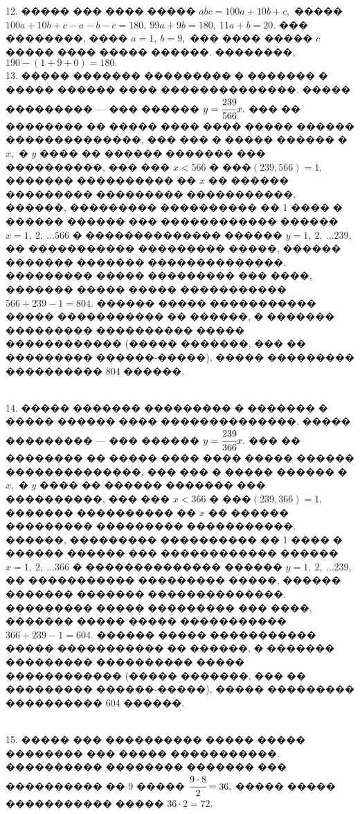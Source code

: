 \documentclass[12pt]{article}
\begin{document}
12. ����� ��� ���� ����� $\overline{abc}=100a+10b+c,$ ����� $100a+10b+c-a-b-c=180,\ 99a+9b=180,\ 11a+b=20.$ ��� ��������, ���� $a=1,\ b=9,$ ��� ���� ����� $c$ ����� ���� ����� ������. ��������, $190-(1+9+0)=180.$\\
13. ����� ������� ��������� � ������� � ����� ������ ���� ��������������. ����� ��������� --- ��� ������ $y=\cfrac{239}{566}x.$ ��� �� �������� �� ����� ���� ���� ����� ������ ��������������, ��� ��� � ����� ������ � $x,$ � $y$ ���� �� ������ ������� ��� ����������, ��� ��� $x<566$ � $\text{���}(239,566)=1,$ ������� ���������� �� $x$ �� ������ ��������� ��������� �����������. ������, ��������� ���������� �� 1 ���� � ������ ������ ��� ������������ ������ $x=1,\ 2,\ \ldots 566$ � �������������� ������ $y=1,\ 2,\ \ldots 239,$ �� ����������� ��������� �����, ������ ������� ������� ��������������. ��������� ����� ��������� ��� ����, ������� ����� ����� ����������� $566+239-1=804.$ ������ ����� ����������� ����� ����������� �� ������, � ������� ��������� ���������� ����� ������������ (����� �������, ��� �� ��������� ������-�����), ����� ��������� ���������� 804 ������.
\begin{figure}[ht!]
\end{figure}\\
14. ����� ������� ��������� � ������� � ����� ������ ���� ��������������. ����� ��������� --- ��� ������ $y=\cfrac{239}{366}x.$ ��� �� �������� �� ����� ���� ���� ����� ������ ��������������, ��� ��� � ����� ������ � $x,$ � $y$ ���� �� ������ ������� ��� ����������, ��� ��� $x<366$ � $\text{���}(239,366)=1,$ ������� ���������� �� $x$ �� ������ ��������� ��������� �����������. ������, ��������� ���������� �� 1 ���� � ������ ������ ��� ������������ ������ $x=1,\ 2,\ \ldots 366$ � �������������� ������ $y=1,\ 2,\ \ldots 239,$ �� ����������� ��������� �����, ������ ������� ������� ��������������. ��������� ����� ��������� ��� ����, ������� ����� ����� ����������� $366+239-1=604.$ ������ ����� ����������� ����� ����������� �� ������, � ������� ��������� ���������� ����� ������������ (����� �������, ��� �� ��������� ������-�����), ����� ��������� ���������� 604 ������.
\begin{figure}[ht!]
\end{figure}\\
15. ����� ��� ���������� ����� ����� �������� ��� ����� �����������. ���������� �������� ������� ��� ���������� �� 9 ����� $\cfrac{9\cdot8}{2}=36,$ ����� ����� ����������� ����� $36\cdot2=72.$\\
\end{document}

